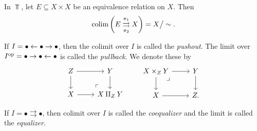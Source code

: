 \documentclass{article}[11pt]
\renewcommand{\dot}{\bullet }
\begin{document}
\begin{example} In $\Top$, let $E\subseteq X\times X$ be an equivalence relation on $X$. Then
	\begin{align*}
		\mathop{\operatorname*{colim}} \left( E \underset{\pi_2}{\overset{\pi_1}{\rightrightarrows}} X \right) = X\big/\sim.
	\end{align*}
\end{example}

\begin{definition} If $I = \dot \from \dot \to \dot$, then the colimit over $I$ is called the \textit{pushout}. The limit over $I^\op = \dot \to \dot \from \dot$ is called the \textit{pullback}. We denote these by
\[
	\begin{tikzcd}
	Z\dar\rar & Y\dar \\
	X\rar & X\amalg_Z Y\po
	\end{tikzcd}\quad\quad
	\begin{tikzcd}
	X\times_Z Y \pb\rar\dar & Y\dar \\
	X\rar & Z.
	\end{tikzcd}
\]
\end{definition}

\begin{definition}
If $I=\dot \rightrightarrows \dot$, then colimit over $I$ is called the \emph{coequalizer} and the limit is called the \emph{equalizer}. 
\end{definition}
\end{document}
